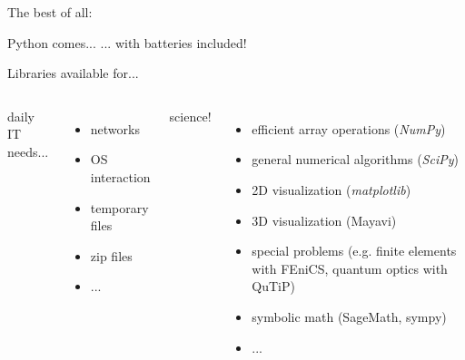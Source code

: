\begin{frame}{The best of all:}

\begin{exbox}{Python comes...}
    ... with \alert{batteries included}!
\end{exbox}

\vspace{-1.25ex}

\begin{center}
    Libraries available for...
\end{center}

\vspace{-4.5ex}

\begin{columns}[t]


\begin{center}
    daily IT needs...
\end{center}

\vspace{-2.5ex}

\begin{itemize}
    \item networks
    \item OS interaction
    \item temporary files
    \item zip files
    \item ...
\end{itemize}


\begin{center}
    \alert{science!}
\end{center}

\vspace{-2.5ex}

\begin{itemize}
    \item efficient array operations (\emph{NumPy})
    \item general numerical algorithms (\emph{SciPy})
    \item 2D visualization (\emph{matplotlib})
    \item 3D visualization (Mayavi)
    \item special problems (e.g. finite elements with FEniCS, quantum optics with QuTiP)
    \item symbolic math (SageMath, sympy)
    \item ...
\end{itemize}

\end{columns}

\end{frame}

